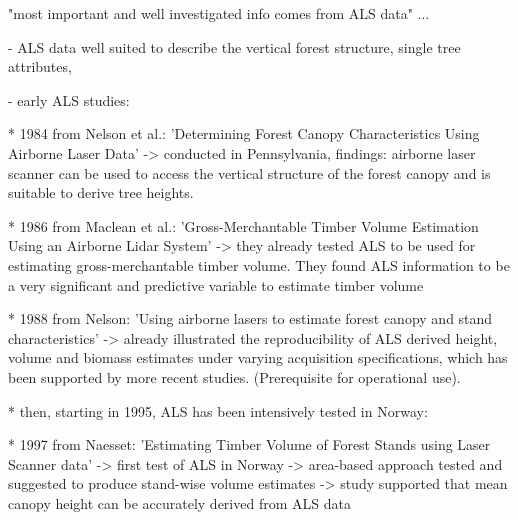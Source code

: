 





"most important and well investigated info comes from ALS data" ...

 - ALS data well suited to describe the vertical forest structure, single tree attributes, 

	- early ALS studies:
	
		*  1984 from Nelson et al.: 'Determining Forest Canopy Characteristics Using Airborne Laser Data'
		  -> conducted in Pennsylvania, findings: airborne laser scanner can be used to access the vertical structure of the forest canopy and is suitable to derive tree heights.
		  
		* 1986 from Maclean et al.: 'Gross-Merchantable Timber Volume Estimation Using an Airborne Lidar System'
		  -> they already tested ALS to be used for estimating gross-merchantable timber volume. They found ALS information to be a very significant and predictive variable to estimate timber volume
		     
		* 1988 from Nelson: 'Using airborne lasers to estimate forest canopy and stand characteristics'
		  -> already illustrated the reproducibility of ALS derived height, volume and biomass estimates under varying acquisition specifications, which has been supported by more recent studies. (Prerequisite for operational use).
		     
		* then, starting in 1995, ALS has been intensively tested in Norway:    
		     
			* 1997 from Naesset: 'Estimating Timber Volume of Forest Stands using Laser Scanner data'
			  -> first test of ALS in Norway
			  -> area-based approach tested and suggested to produce stand-wise volume estimates
			  -> study supported that mean canopy height can be accurately derived from ALS data
			  
